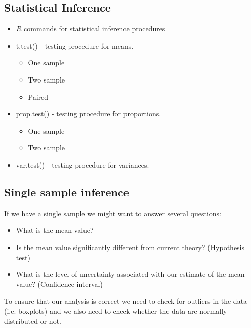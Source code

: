 
\subsection{Statistical Inference}
\begin{itemize}
\item $R$ commands for statistical inference procedures \item
t.test() - testing procedure for means.
\begin{itemize}
\item One sample \item Two sample \item Paired
\end{itemize}
\item prop.test() - testing procedure for proportions.
\begin{itemize}
\item One sample \item Two sample
\end{itemize}
\item var.test() - testing procedure for variances.
\end{itemize}
%




\subsection{Single sample inference}

If we have a single sample we might want to answer several
questions:
\begin{itemize}
\item What is the mean value? \item Is the mean value
significantly different from current theory? (Hypothesis test)
\item What is the level of uncertainty associated with our
estimate of the mean value? (Confidence interval)
\end{itemize}
To ensure that our analysis is correct we need to check for
outliers in the data (i.e. boxplots) and we also need to check
whether the data are normally distributed or not.
%


